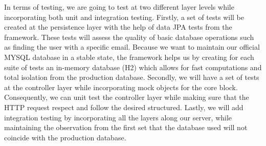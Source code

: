 In terms of testing, we are going to test at two different layer levels while incorporating both unit and integration testing. Firstly, a set of tests will be created at the persistence layer with the help of data JPA tests from the framework. These tests will assess the quality of basic database operations such as finding the user with a specific email. Because we want to maintain our official MYSQL database in a stable state, the framework helps us by creating for each suite of tests an in-memory database (H2) which allows for fast computations and total isolation from the production database. Secondly, we will have a set of tests at the controller layer while incorporating mock objects for the core block. Consequently, we can unit test the controller layer while making sure that the HTTP request respect and follow the desired structured. Lastly, we will add integration testing by incorporating all the layers along our server, while maintaining the observation from the first set that the database used will not coincide with the production database.